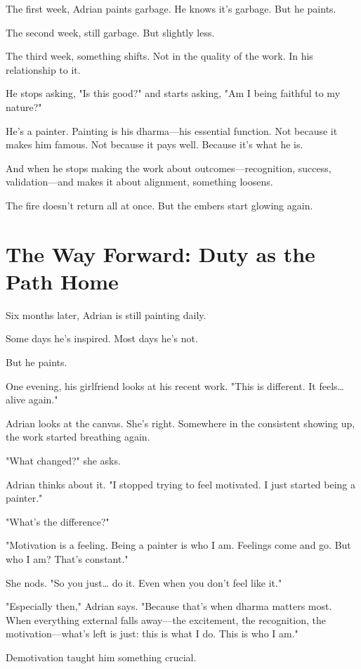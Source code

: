 \documentclass[11pt,twoside]{book}
\begin{document}
The first week, Adrian paints garbage. He knows it's garbage. But he paints.

The second week, still garbage. But slightly less.

The third week, something shifts. Not in the quality of the work. In his relationship to it.

He stops asking, "Is this good?" and starts asking, "Am I being faithful to my nature?"

He's a painter. Painting is his dharma—his essential function. Not because it makes him famous. Not because it pays well. Because it's what he is.

And when he stops making the work about outcomes—recognition, success, validation—and makes it about alignment, something loosens.

The fire doesn't return all at once. But the embers start glowing again.

\section*{The Way Forward: Duty as the Path Home}

Six months later, Adrian is still painting daily.

Some days he's inspired. Most days he's not.

But he paints.

One evening, his girlfriend looks at his recent work. "This is different. It feels\ldots{} alive again."

Adrian looks at the canvas. She's right. Somewhere in the consistent showing up, the work started breathing again.

"What changed?" she asks.

Adrian thinks about it. "I stopped trying to feel motivated. I just started being a painter."

"What's the difference?"

"Motivation is a feeling. Being a painter is who I am. Feelings come and go. But who I am? That's constant."

She nods. "So you just\ldots{} do it. Even when you don't feel like it."

"Especially then," Adrian says. "Because that's when dharma matters most. When everything external falls away—the excitement, the recognition, the motivation—what's left is just: this is what I do. This is who I am."

Demotivation taught him something crucial.
\end{document}
